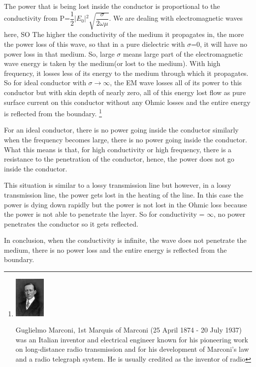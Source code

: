 The power that is being lost inside the conductor is proportional to the conductivity from P=$\dfrac{1}{2}$$\lvert E_{0}\rvert$$^{2}$$\sqrt{\dfrac{\sigma}{2\omega\mu}}$.
We are dealing with electromagnetic waves here, SO The higher the conductivity of the medium it propagates in, the more the power loss of this wave, so that in a pure dielectric with $\sigma$=0, it will have no power loss in that medium. So, large $\sigma$ means large part of the electromagnetic wave energy is taken by the medium(or lost to the medium). With high frequency, it  losses less of its energy to the medium through which it propagates. So for ideal conductor with $\sigma$$\longrightarrow$$\infty$, the EM wave losses all of its power to this conductor but with skin depth of nearly zero, all of this energy lost flow as pure surface current on this conductor without any Ohmic losses and the entire energy is reflected from the boundary.
\footnote{\includegraphics[height=20mm]{./graphics/footnotegm.jpg}

Guglielmo Marconi, 1st Marquis of Marconi (25 April 1874 - 20 July 1937) was an Italian inventor and electrical engineer known for his pioneering work on long-distance radio transmission and for his development of Marconi's law and a radio telegraph system. He is usually credited as the inventor of radio}

For an ideal conductor, there is no power going inside the conductor similarly when the frequency becomes large, there is no power going inside the conductor. What this means is that, for high conductivity or high frequency, there is a resistance to the penetration of the conductor, hence, the power does not go inside the conductor.

This situation is similar to a lossy transmission line but however, in a lossy transmission line, the power gets lost in the heating of the line. In this case the power is dying down rapidly but the power is not lost in the Ohmic loss because the power is not able to penetrate the layer. So for conductivity = $\infty$, no power penetrates the conductor so it gets reflected.

In conclusion, when the conductivity is infinite, the wave does not penetrate the medium, there is no power loss and the entire energy is reflected from the boundary.
